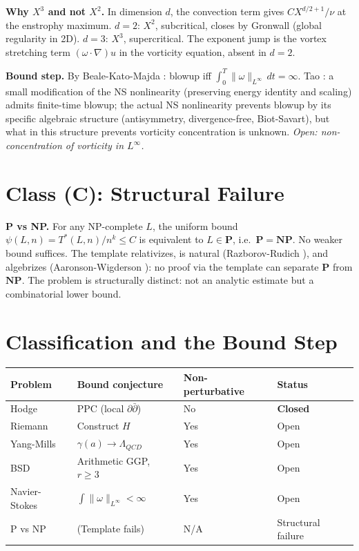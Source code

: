\documentclass[12pt]{article}
\theoremstyle{remark}
\begin{document}
\textbf{Why $X^3$ and not $X^2$.} In dimension $d$, the convection term gives
$CX^{d/2+1}/\nu$ at the enstrophy maximum. $d=2$: $X^2$, subcritical, closes
by Gronwall (global regularity in 2D). $d=3$: $X^3$, supercritical. The
exponent jump is the vortex stretching term $(\omega\cdot\nabla)u$ in the
vorticity equation, absent in $d=2$.

\textbf{Bound step.} By Beale-Kato-Majda \cite{bkm1984}: blowup iff
$\int_0^T\|\omega\|_{L^\infty}\,dt=\infty$. Tao \cite{tao2016}: a small
modification of the NS nonlinearity (preserving energy identity and scaling)
admits finite-time blowup; the actual NS nonlinearity prevents blowup by its
specific algebraic structure (antisymmetry, divergence-free, Biot-Savart),
but what in this structure prevents vorticity concentration is unknown.
\textit{Open: non-concentration of vorticity in $L^\infty$.}

\section{Class (C): Structural Failure}

\textbf{P vs NP.} For any NP-complete $L$, the uniform bound
$\psi(L,n)=T^*(L,n)/n^k\leq C$ is equivalent to $L\in\mathbf{P}$, i.e.\
$\mathbf{P}=\mathbf{NP}$. No weaker bound suffices. The template relativizes,
is natural (Razborov-Rudich \cite{rr1994}), and algebrizes (Aaronson-Wigderson
\cite{aw2009}): no proof via the template can separate $\mathbf{P}$ from
$\mathbf{NP}$. The problem is structurally distinct: not an analytic estimate
but a combinatorial lower bound.

\section{Classification and the Bound Step}

\begin{center}
\begin{tabular}{@{}llll@{}}
\toprule
Problem & Bound conjecture & Non-perturbative & Status \\
\midrule
Hodge & PPC (local $\partial\bar\partial$) & No & \textbf{Closed} \\
Riemann & Construct $H$ & Yes & Open \\
Yang-Mills & $\gamma(a)\to\Lambda_{QCD}$ & Yes & Open \\
BSD & Arithmetic GGP, $r\geq 3$ & Yes & Open \\
Navier-Stokes & $\int\|\omega\|_{L^\infty}<\infty$ & Yes & Open \\
P vs NP & (Template fails) & N/A & Structural failure \\
\bottomrule
\end{tabular}
\end{center}
\end{document}
